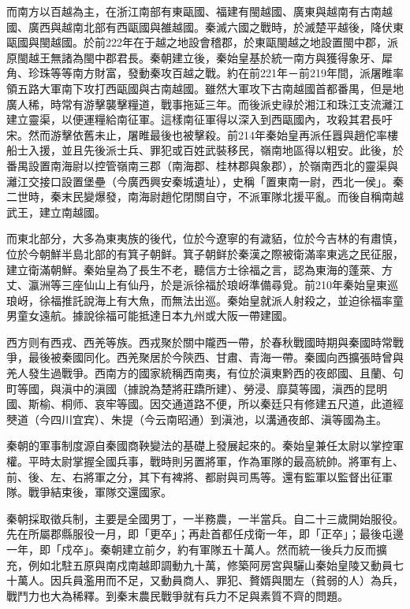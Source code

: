 而南方以百越為主，在浙江南部有東甌國、福建有閩越國、廣東與越南有古南越國、廣西與越南北部有西甌國與雒越國。秦滅六國之戰時，於滅楚平越後，降伏東甌國與閩越國。於前222年在于越之地設會稽郡，於東甌閩越之地設置閩中郡，派原閩越王無諸為閩中郡君長。秦朝建立後，秦始皇基於統一南方與獲得象牙、犀角、珍珠等等南方財富，發動秦攻百越之戰。約在前221年－前219年間，派屠睢率領五路大軍南下攻打西甌國與古南越國。雖然大軍攻下古南越國首都番禺，但是地廣人稀，時常有游擊襲擊糧道，戰事拖延三年。而後派史祿於湘江和珠江支流灕江建立靈渠，以便運糧給南征軍。這樣南征軍得以深入到西甌國內，攻殺其君長吁宋。然而游擊依舊未止，屠睢最後也被擊殺。前214年秦始皇再派任囂與趙佗率樓船士入援，並且先後派士兵、罪犯或百姓武裝移民，嶺南地區得以粗安。此後，於番禺設置南海尉以控管嶺南三郡（南海郡、桂林郡與象郡），於嶺南西北的靈渠與灕江交接口設置堡壘（今廣西興安秦城遺址），史稱「置東南一尉，西北一侯」。秦二世時，秦末民變爆發，南海尉趙佗閉關自守，不派軍隊北援平亂。而後自稱南越武王，建立南越國。

而東北部分，大多為東夷族的後代，位於今遼寧的有濊貊，位於今吉林的有肅慎，位於今朝鮮半島北部的有箕子朝鲜。箕子朝鲜於秦漢之際被衛滿率東逃之民征服，建立衛滿朝鮮。秦始皇為了長生不老，聽信方士徐福之言，認為東海的蓬萊、方丈、瀛洲等三座仙山上有仙丹，於是派徐福於琅岈準備尋覓。前210年秦始皇東巡琅岈，徐福推託說海上有大魚，而無法出巡。秦始皇就派人射殺之，並迫徐福率童男童女遠航。據說徐福可能抵達日本九州或大阪一帶建國。

西方则有西戎、西羌等族。西戎聚於關中隴西一帶，於春秋戰國時期與秦國時常戰爭，最後被秦國同化。西羌聚居於今陝西、甘肅、青海一帶。秦國向西擴張時曾與羌人發生過戰爭。西南方的國家統稱西南夷，有位於滇東黔西的夜郎國、且蘭、句町等國，與滇中的滇國（據說為楚將莊蹻所建）、勞浸、靡莫等國，滇西的昆明國、斯榆、桐师、哀牢等國。因交通道路不便，所以秦廷只有修建五尺道，此道經僰道（今四川宜宾）、朱提（今云南昭通）到滇池，以溝通夜郎、滇等國為主。

秦朝的軍事制度源自秦國商鞅變法的基礎上發展起來的。秦始皇兼任太尉以掌控軍權。平時太尉掌握全國兵事，戰時則另置將軍，作為軍隊的最高統帥。將軍有上、前、後、左、右將軍之分，其下有裨將、都尉與司馬等。還有監軍以監督出征軍隊。戰爭結束後，軍隊交還國家。

秦朝採取徵兵制，主要是全國男丁，一半務農，一半當兵。自二十三歲開始服役。先在所屬郡縣服役一月，即「更卒」；再赴首都任戍衛一年，即「正卒」；最後屯邊一年，即「戍卒」。秦朝建立前夕，約有軍隊五十萬人。然而統一後兵力反而擴充，例如北駐五原與南戍南越即調動九十萬，修築阿房宮與驪山秦始皇陵又動員七十萬人。因兵員濫用而不足，又動員商人、罪犯、贅婿與閭左（貧弱的人）為兵，戰鬥力也大為稀釋。到秦末農民戰爭就有兵力不足與素質不齊的問題。

